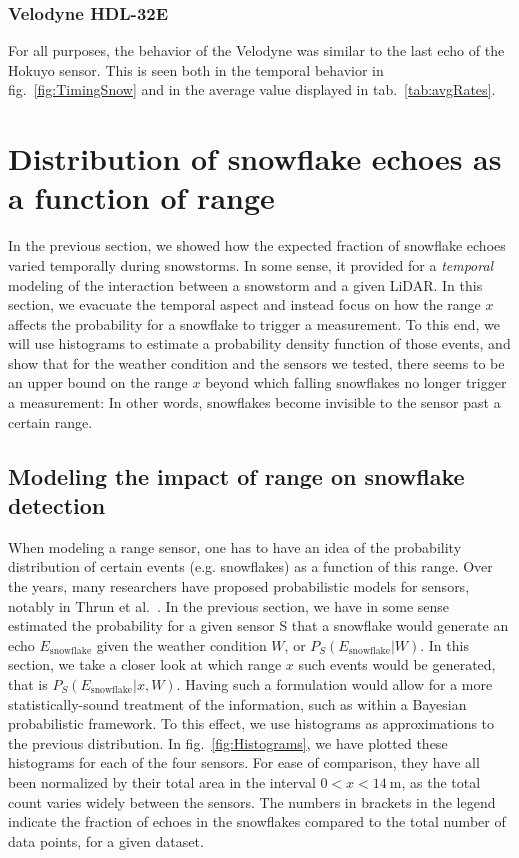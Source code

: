 \subsubsection{Velodyne HDL-32E}
For all purposes, the behavior of the Velodyne was similar to the last echo of the Hokuyo sensor. This is seen both in the temporal behavior in fig.~\ref{fig:TimingSnow} and in the average value displayed in tab.~\ref{tab:avgRates}.

\section{Distribution of snowflake echoes as a function of range}
\label{sec:Histo}

In the previous section, we showed how the expected fraction of snowflake echoes varied temporally during snowstorms. In some sense, it provided for a \emph{temporal} modeling of the interaction between a snowstorm and a given LiDAR. In this section, we evacuate the temporal aspect and instead focus on how the range $x$ affects the probability for a snowflake to trigger a measurement. To this end, we will use histograms to estimate a probability density function of those events, and show that for the weather condition and the sensors we tested, there seems to be an upper bound on the range $x$ beyond which falling snowflakes no longer trigger a measurement: In other words, snowflakes become invisible to the sensor past a certain range.

\subsection{Modeling the impact of range on snowflake detection}
When modeling a range sensor, one has to have an idea of the probability distribution of certain events (e.g. snowflakes) as a function of this range. Over the years, many researchers have proposed probabilistic models for sensors, notably in Thrun et al.~\cite{Thrun:2005:PR:1121596}. In the previous section, we have in some sense estimated the probability for a given sensor S that a snowflake would generate an echo $E_\text{snowflake}$ given the weather condition $W$, or $P_S(E_\text{snowflake}|W)$. In this section, we take a closer look at which range $x$ such events would be generated, that is $P_S(E_\text{snowflake}|x,W)$. Having such a formulation would allow for a more statistically-sound treatment of the information, such as within a Bayesian probabilistic framework. To this effect, we use histograms as approximations to the previous distribution. In fig.~\ref{fig:Histograms}, we have plotted these histograms for each of the four sensors. For ease of comparison, they have all been normalized by their total area in the interval $0 < x < \SI{14}{\meter}$, as the total count varies widely between the sensors. The numbers in brackets in the legend indicate the fraction of echoes in the snowflakes compared to the total number of data points, for a given dataset.

